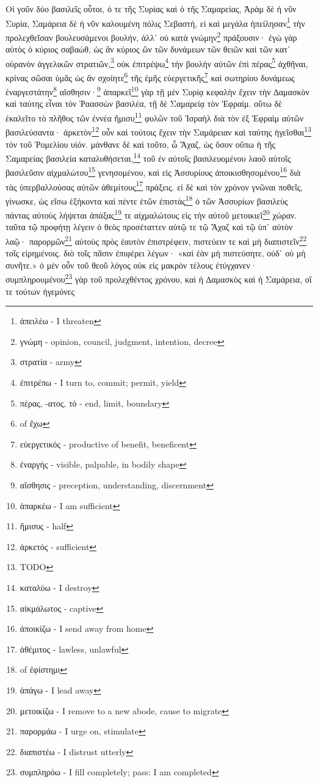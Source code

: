 Οἱ
γοῦν
δύο
βασιλεῖς
οὗτοι, 
ὁ
τε
τῆς
Συρίας
καὶ
ὁ
τῆς
Σαμαρείας, 
Ἀρὰμ
δὲ
ἡ
νῦν
Συρία, 
Σαμάρεια
δὲ
ἡ
νῦν
καλουμένη
πόλις
Σεβαστή, 
εἰ
καὶ
μεγάλα
ἠπείλησαν\footnote{ἀπειλέω - I threaten}
τὴν
προλεχθεῖσαν
βουλευσάμενοι
βουλήν, 
ἀλλ᾽
οὐ
κατὰ
γνώμην\footnote{γνώμη - opinion, council, judgment, intention, decree}
πράξουσιν·
ἐγὼ
γὰρ
αὐτὸς
ὁ
κύριος
σαβαώθ, 
ὡς
ἂν
κύριος
ὢν
τῶν
δυνάμεων
τῶν
θειῶν
καὶ
τῶν
κατ᾽ 
οὐρανὸν
ἀγγελικῶν
στρατιῶν,\footnote{στρατία - army}
οὐκ
ἐπιτρέψω\footnote{ἐπιτρέπω - I turn to, commit; permit, yield}
τὴν
βουλὴν
αὐτῶν
ἐπὶ
πέρας\footnote{πέρας, -ατος, τό - end, limit, boundary}
ἀχθῆναι, 
κρίνας
σῶσαι
ὑμᾶς
ὡς
ἂν
σχοίητε\footnote{ of ἔχω}
τῆς
ἐμῆς
εὐεργετικῆς\footnote{εὐεργετικός - productive of benefit, beneficent}
καὶ
σωτηρίου
δυνάμεως
ἐναργεστάτην\footnote{ἐναργής - visible, palpable, in bodily shape}
αἴσθησιν·\footnote{αἴσθησις - preception, understanding, discernment}
ἀπαρκεῖ\footnote{ἀπαρκέω - I am sufficient}
γὰρ
τῇ
μὲν
Συρίᾳ
κεφαλὴν
ἔχειν
τὴν
∆αμασκὸν
καὶ
ταύτης
εἶναι
τὸν
Ῥαασσὼν
βασιλέα, 
τῇ
δὲ
Σαμαρείᾳ
τὸν
Ἐφραίμ. 
οὕτω
δὲ
ἐκαλεῖτο
τὸ
πλῆθος
τῶν
ἐννέα
ἥμισυ\footnote{ἥμισυς - half}
φυλῶν
τοῦ
Ἰσραὴλ
διὰ
τὸν
ἐξ
Ἐφραὶμ
αὐτῶν
βασιλεύσαντα·
ἀρκετὸν\footnote{ἀρκετός - sufficient}
οὖν
καὶ
τούτοις
ἔχειν
τὴν
Σαμάρειαν
καὶ
ταύτης
ἡγεῖσθαι\footnote{TODO}
τὸν
τοῦ
Ῥομελίου
υἱόν. 
μάνθανε
δὲ
καὶ
τοῦτο, 
ὦ
Ἄχαζ,
ὡς
ὅσον
οὔπω
ἡ
τῆς
Σαμαρείας
βασιλεία
καταλυθήσεται,\footnote{καταλύω - I destroy}
τοῦ
ἐν
αὐτοῖς
βασιλευομένου
λαοῦ
αὐτοῖς
βασιλεῦσιν
αἰχμαλώτου\footnote{αἰκμάλωτος - captive}
γενησομένου,
καὶ
εἰς
Ἀσσυρίους
ἀποικισθησομένου\footnote{ἀποικίζω - I send away from home}
διὰ
τὰς
ὑπερβαλλούσας
αὐτῶν
ἀθεμίτους\footnote{ἀθέμιτος - lawless, unlawful}
πράξεις.
εἰ
δὲ
καὶ
τὸν
χρόνον
γνῶναι
ποθεῖς,
γίνωσκε, 
ὡς
εἴσω
ἑξήκοντα
καὶ
πέντε
ἐτῶν
ἐπιστὰς\footnote{ of ἐφίστημι}
ὁ
τῶν
Ἀσσυρίων
βασιλεὺς
πάντας
αὐτοὺς
λήψεται
ἀπάξας\footnote{ἀπάγω - I lead away}
τε
αἰχμαλώτους
εἰς
τὴν
αὐτοῦ
μετοικιεῖ\footnote{μετοικίζω - I remove to a new abode, cause to migrate}
χώραν. 
ταῦτα
τῷ
προφήτῃ
λέγειν
ὁ
θεὸς
προσέταττεν
αὐτῷ
τε
τῷ
Ἄχαζ
καὶ
τῷ
ὑπ᾽
αὐτὸν
λαῷ·
παρορμῶν\footnote{παρορμάω - I urge on, stimulate}
αὐτοὺς
πρὸς
ἑαυτὸν
ἐπιστρέφειν, 
πιστεύειν
τε
καὶ
μὴ
διαπιστεῖν\footnote{διαπιστέω - I distrust utterly}
τοῖς
εἰρημένοις. 
διὸ
τοῖς
πᾶσιν
ἐπιφέρει
λέγων·
«καὶ
ἐὰν
μὴ
πιστεύσητε, 
οὐδ᾽
οὐ
μὴ
συνῆτε.»
ὁ
μὲν
οὖν
τοῦ
θεοῦ
λόγος
οὐκ
εἰς
μακρὸν
τέλους
ἐτύγχανεν·
συμπληρουμένου\footnote{συμπληρόω - I fill completely; pass: I am completed}
γὰρ
τοῦ
προλεχθέντος
χρόνου, 
καὶ
ἡ
∆αμασκὸς
καὶ
ἡ
Σαμάρεια, 
οἵ
τε
τούτων
ἡγεμόνες

